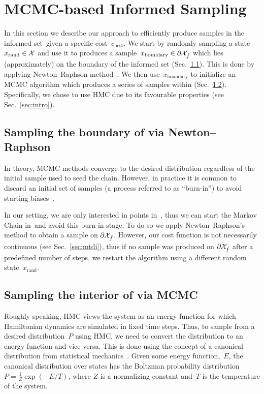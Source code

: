 \documentclass[letterpaper, 10 pt, conference]{ieeeconf}  %
\begin{document}
\section{MCMC-based Informed Sampling}
In this section we describe our approach to efficiently produce samples in the informed set~\Cinf given a specific cost~$c_{\text{best}}$.
We start  by randomly sampling a state~$x_\text{rand} \in \mathcal{X}$ and use it
to produces a sample~$x_\text{boundary} \in \partial\mathcal{X}_{\hat{f}}$ which lies (approximately) on the boundary of the informed set (Sec.~\ref{subsec:grad}).
This is done by applying Newton–Raphson method~\cite{RT06}.
We then use~$x_\text{boundary}$ to initialize an MCMC algorithm which produces a series of samples within \Cinf (Sec.~\ref{subsec:mcmc}). Specifically, we chose to use HMC due to its favourable properties (see Sec.~\ref{sec:intro}). 



\subsection{Sampling the boundary of \Cinf via Newton–Raphson}
\label{subsec:grad}
In theory, MCMC methods converge to the desired distribution regardless of the initial sample used to seed the chain.
However, in practice it is common to discard an initial set of samples (a process referred to as ``burn-in'') to avoid starting biases~\cite{ADDJ03}. 

In our setting, we are only interested in points in~\Cinf, thus we can start the Markov Chain in~\Cinf and avoid this burn-in stage. 
To do so we apply  Newton–Raphson's method to obtain a sample on $\partial \mathcal{X}_{\hat{f}}$. 
However, our cost function is not necessarily continuous (see Sec.~\ref{sec:mtdi}), thus if no sample was produced on $\partial \mathcal{X}_{\hat{f}}$ after a predefined number of steps, we restart the algorithm using a different random state~$x_\text{rand}$.


\subsection{Sampling the interior of \Cinf via
MCMC}
\label{subsec:mcmc}

	Roughly speaking, HMC views the system as an energy function for which Hamiltonian dynamics are simulated in fixed time steps.
	Thus, to sample from a desired distribution~$P$ using HMC, we need to convert the distribution to an energy function and vice-versa.
	This is done using the concept of a canonical distribution from statistical mechanics~\cite{N11}. 
	Given some energy function,~$E$, the canonical distribution over states has the Boltzman probability distribution $P = \frac{1}{Z}\exp (-E/T)$, where $Z$ is a normalizing constant and~$T$ is the temperature of the system.
\end{document}
